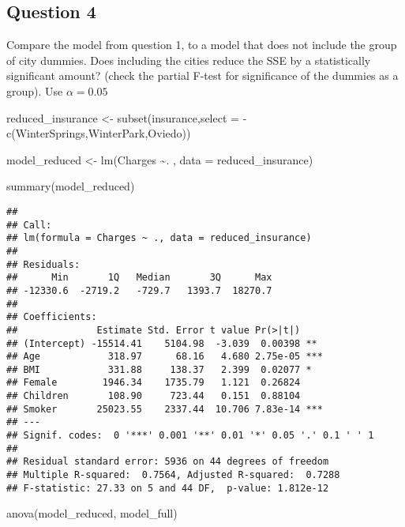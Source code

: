 \documentclass[
]{article}
\newenvironment{Shaded}{\begin{snugshade}}{\end{snugshade}}
\newcommand{\AttributeTok}[1]{\textcolor[rgb]{0.77,0.63,0.00}{#1}}
\newcommand{\FunctionTok}[1]{\textcolor[rgb]{0.00,0.00,0.00}{#1}}
\newcommand{\NormalTok}[1]{#1}
\newcommand{\OtherTok}[1]{\textcolor[rgb]{0.56,0.35,0.01}{#1}}
\newcommand{\SpecialCharTok}[1]{\textcolor[rgb]{0.00,0.00,0.00}{#1}}
\begin{document}
\hypertarget{question-4}{%
\subsection{Question 4}\label{question-4}}

Compare the model from question 1, to a model that does not include the
group of city dummies. Does including the cities reduce the SSE by a
statistically significant amount? (check the partial F-test for
significance of the dummies as a group). Use \(\alpha = 0.05\)

\begin{Shaded}
\begin{Highlighting}[]
\NormalTok{reduced\_insurance }\OtherTok{\textless{}{-}} \FunctionTok{subset}\NormalTok{(insurance,}\AttributeTok{select =} \SpecialCharTok{{-}}\FunctionTok{c}\NormalTok{(WinterSprings,WinterPark,Oviedo))}
                      
\NormalTok{model\_reduced }\OtherTok{\textless{}{-}} \FunctionTok{lm}\NormalTok{(Charges }\SpecialCharTok{\textasciitilde{}}\NormalTok{. , }\AttributeTok{data =}\NormalTok{ reduced\_insurance)    }

\FunctionTok{summary}\NormalTok{(model\_reduced)}
\end{Highlighting}
\end{Shaded}

\begin{verbatim}
## 
## Call:
## lm(formula = Charges ~ ., data = reduced_insurance)
## 
## Residuals:
##      Min       1Q   Median       3Q      Max 
## -12330.6  -2719.2   -729.7   1393.7  18270.7 
## 
## Coefficients:
##              Estimate Std. Error t value Pr(>|t|)    
## (Intercept) -15514.41    5104.98  -3.039  0.00398 ** 
## Age            318.97      68.16   4.680 2.75e-05 ***
## BMI            331.88     138.37   2.399  0.02077 *  
## Female        1946.34    1735.79   1.121  0.26824    
## Children       108.90     723.44   0.151  0.88104    
## Smoker       25023.55    2337.44  10.706 7.83e-14 ***
## ---
## Signif. codes:  0 '***' 0.001 '**' 0.01 '*' 0.05 '.' 0.1 ' ' 1
## 
## Residual standard error: 5936 on 44 degrees of freedom
## Multiple R-squared:  0.7564, Adjusted R-squared:  0.7288 
## F-statistic: 27.33 on 5 and 44 DF,  p-value: 1.812e-12
\end{verbatim}

\begin{Shaded}
\begin{Highlighting}[]
\FunctionTok{anova}\NormalTok{(model\_reduced, model\_full)}
\end{Highlighting}
\end{Shaded}
\end{document}
